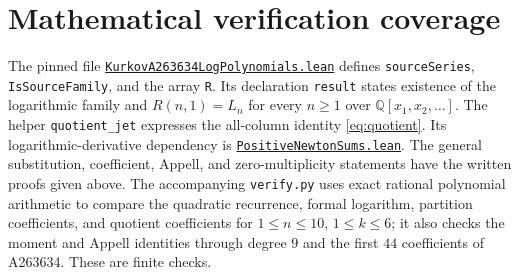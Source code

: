 \documentclass[11pt]{article}
\newcommand{\Q}{\mathbb Q}
\begin{document}
\section{Mathematical verification coverage}
The pinned file
\href{https://github.com/the-omega-institute/trureturing/blob/6a3b29c88128eeed17f731783f03e7f9ff92ae62/D5/S3/Combinatorics/PowerSeries/KurkovA263634LogPolynomials.lean}{\small\texttt{KurkovA263634LogPolynomials.lean}}
defines \texttt{sourceSeries}, \texttt{IsSourceFamily}, and the array
\texttt{R}. Its declaration \texttt{result} states existence of the logarithmic family and
$R(n,1)=L_n$ for every $n\geq1$ over $\Q[x_1,x_2,\ldots]$.
The helper \texttt{quotient\_jet} expresses the all-column identity
\eqref{eq:quotient}. Its logarithmic-derivative dependency is
\href{https://github.com/the-omega-institute/trureturing/blob/6a3b29c88128eeed17f731783f03e7f9ff92ae62/D5/S3/Combinatorics/PowerSeries/PositiveNewtonSums.lean}{\texttt{PositiveNewtonSums.lean}}.
The general substitution, coefficient, Appell, and zero-multiplicity
statements have the written proofs given above. The accompanying
\texttt{verify.py} uses exact rational polynomial arithmetic to compare
the quadratic recurrence, formal logarithm, partition coefficients,
and quotient coefficients for $1\leq n\leq10$, $1\leq k\leq6$;
it also checks the moment and Appell identities through degree $9$
and the first $44$ coefficients of A263634. These are finite checks.
\end{document}
